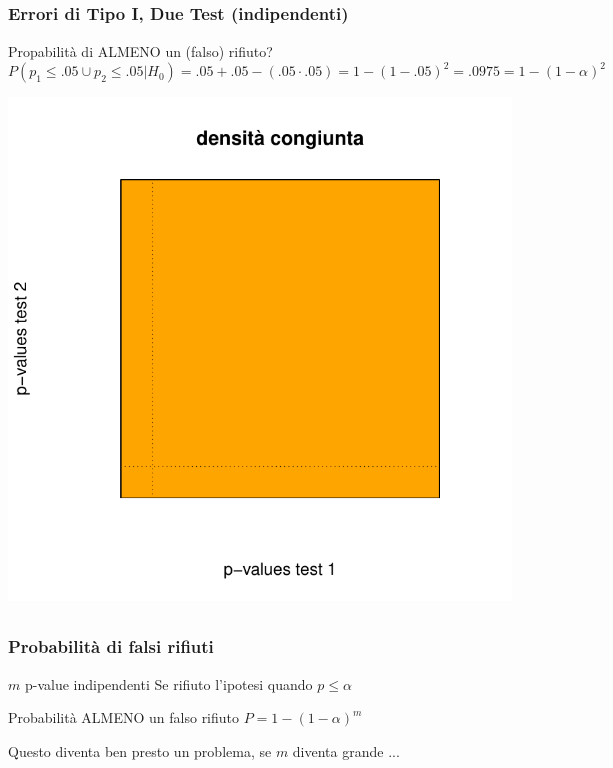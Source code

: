 \documentclass[xcolor={pdftex,dvipsnames,table}]{beamer}
\newcommand{\bb}[1]{\begin{block}{#1}}
\newcommand{\eb}{\end{block}}
\begin{document}
\subsection{}
\begin{frame}
\frametitle{Errori di Tipo I, Due Test (indipendenti)}

Propabilit\`a di ALMENO un (falso) rifiuto?\\
$P(p_1\leq .05 \cup p_2\leq .05 | H_0)= .05+.05-(.05\cdot .05)=1-(1-.05)^2=.0975=1-(1-\alpha)^2$

\includegraphics[scale=.5]{plaatjes/bivaH0indep}
\end{frame}

\subsection{}
\begin{frame}
\frametitle{Probabilit\`a di falsi rifiuti}

\bb{$m$ p-value indipendenti}
Se rifiuto l'ipotesi quando $p\leq \alpha$
\eb
\bb{Probabilit\`a ALMENO un falso rifiuto}
$P = 1- (1-\alpha)^m$
\eb

\pause
\bigskip
Questo diventa ben presto un problema, se $m$ diventa grande ...

\end{frame}
\end{document}
